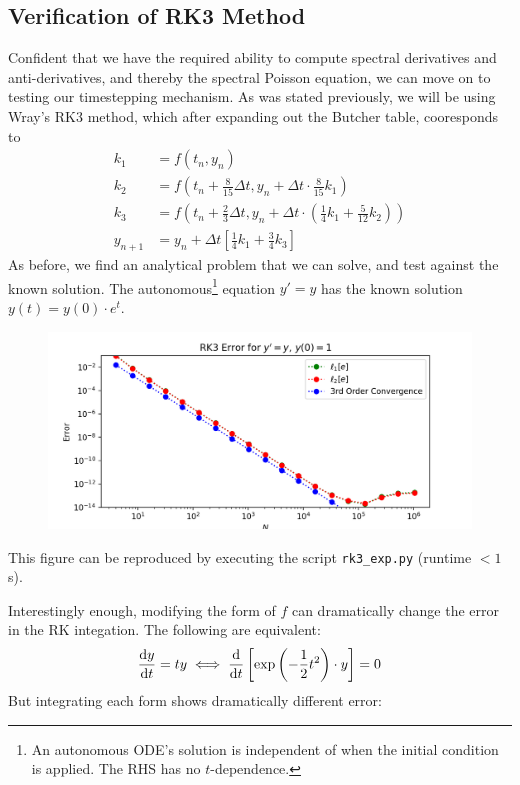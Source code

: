 \documentclass[12pt, reqno]{amsart}
\begin{document}
\subsection{Verification of RK3 Method}
Confident that we have the required ability to compute spectral derivatives and anti-derivatives, and thereby the spectral Poisson equation, we can move on to testing our timestepping mechanism. As was stated previously, we will be using Wray's RK3 method, which after expanding out the Butcher table, cooresponds to
\begin{align}
k_1 &= f(t_n, y_n) \\
k_2 &= f \left(t_n + \frac{8}{15} \Delta t, y_n + \Delta t \cdot \frac{8}{15} k_1 \right) \\
k_3 &= f \left(t_n + \frac{2}{3} \Delta t,  y_n + \Delta t \cdot \left( \frac{1}{4} k_1 + \frac{5}{12} k_2 \right) \right) \\
y_{n + 1} &= y_n + \Delta t \left[ \frac{1}{4} k_1 + \frac{3}{4} k_3 \right]
\end{align}
As before, we find an analytical problem that we can solve, and test against the known solution. The autonomous\footnote{An autonomous ODE's solution is independent of when the initial condition is applied. The RHS has no $t$-dependence.} equation $y' = y$ has the known solution $y(t) = y(0) \cdot e^t$.
\begin{figure}[H]
    \centering
    \includegraphics[width = 1\linewidth]{RK3 Error Convergence.png}
\end{figure}
This figure can be reproduced by executing the script \texttt{rk3\_exp.py} (runtime $<1$ s).

Interestingly enough, modifying the form of $f$ can dramatically change the error in the RK integation. The following are equivalent:
\begin{equation}
    \dv{y}{t} = ty \iff \dv{}{t} \left[ \exp \left( - \frac{1}{2} t^2 \right) \cdot y \right] = 0
\end{equation}
But integrating each form shows dramatically different error:
\end{document}
